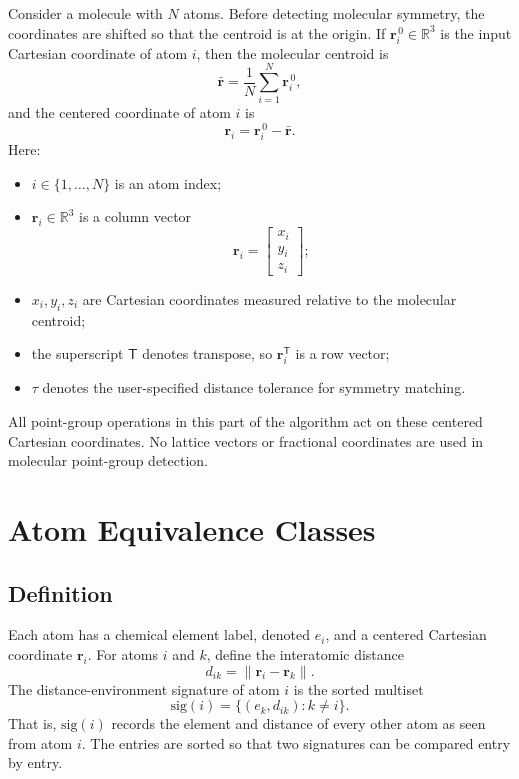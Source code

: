 \documentclass[11pt]{article}
\newcommand{\R}{\mathbb{R}}
\newcommand{\T}{\mathsf{T}}
\begin{document}
Consider a molecule with \(N\) atoms.  Before detecting molecular symmetry, the
coordinates are shifted so that the centroid is at the origin.  If
\(\mathbf r_i^{\,0}\in\R^3\) is the input Cartesian coordinate of atom \(i\),
then the molecular centroid is
\[
    \bar{\mathbf r}
    =
    \frac{1}{N}\sum_{i=1}^{N}\mathbf r_i^{\,0},
\]
and the centered coordinate of atom \(i\) is
\[
    \mathbf r_i
    =
    \mathbf r_i^{\,0} - \bar{\mathbf r}.
\]
Here:
\begin{itemize}
    \item \(i\in\{1,\dots,N\}\) is an atom index;
    \item \(\mathbf r_i\in\R^3\) is a column vector
    \[
        \mathbf r_i =
        \begin{bmatrix}
        x_i\\ y_i\\ z_i
        \end{bmatrix};
    \]
    \item \(x_i,y_i,z_i\) are Cartesian coordinates measured relative to the
    molecular centroid;
    \item the superscript \({\T}\) denotes transpose, so
    \(\mathbf r_i^{\T}\) is a row vector;
    \item \(\tau\) denotes the user-specified distance tolerance for symmetry
    matching.
\end{itemize}

All point-group operations in this part of the algorithm act on these centered
Cartesian coordinates.  No lattice vectors or fractional coordinates are used in
molecular point-group detection.

\section{Atom Equivalence Classes}

\subsection{Definition}

Each atom has a chemical element label, denoted \(e_i\), and a centered Cartesian
coordinate \(\mathbf r_i\).  For atoms \(i\) and \(k\), define the interatomic
distance
\[
    d_{ik} = \lVert \mathbf r_i - \mathbf r_k\rVert .
\]
The distance-environment signature of atom \(i\) is the sorted multiset
\[
    \mathrm{sig}(i)
    =
    \big\{(e_k,d_{ik}) : k\ne i\big\}.
\]
That is, \(\mathrm{sig}(i)\) records the element and distance of every other atom
as seen from atom \(i\).  The entries are sorted so that two signatures can be
compared entry by entry.
\end{document}
